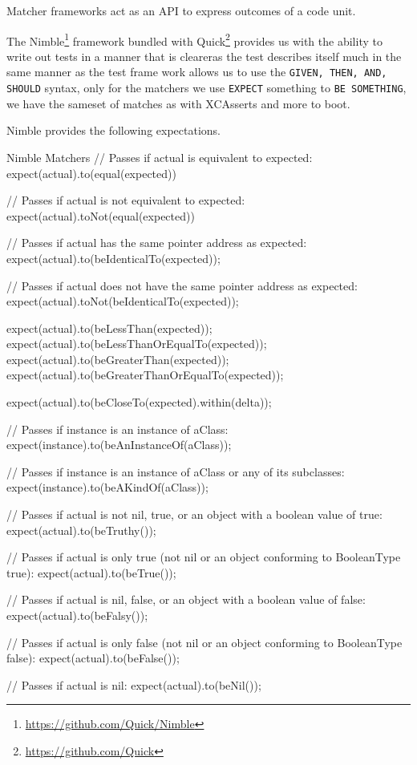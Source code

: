 \documentclass[a4paper, titlepage]{article}
\begin{document}
Matcher frameworks act as an API to express outcomes of a code unit.

The Nimble\footnote{\url{https://github.com/Quick/Nimble}}  framework
bundled with Quick\footnote{\url{https://github.com/Quick}} provides 
us with the ability to write out tests in a manner that is cleareras the
test describes itself much in the same manner as the test frame work
allows us to use the \texttt{GIVEN, THEN, AND, SHOULD} syntax, only for
the matchers we use \texttt{EXPECT} something to \texttt{BE SOMETHING},
we have the sameset of matches as with XCAsserts and more to boot.

Nimble provides the following expectations.
\begin{listbox}{1}{Nimble Matchers}
// Passes if actual is equivalent to expected:
expect(actual).to(equal(expected))

// Passes if actual is not equivalent to expected:
expect(actual).toNot(equal(expected))

// Passes if actual has the same pointer address as expected:
expect(actual).to(beIdenticalTo(expected));

// Passes if actual does not have the same pointer address as expected:
expect(actual).toNot(beIdenticalTo(expected));

expect(actual).to(beLessThan(expected));
expect(actual).to(beLessThanOrEqualTo(expected));
expect(actual).to(beGreaterThan(expected));
expect(actual).to(beGreaterThanOrEqualTo(expected));

expect(actual).to(beCloseTo(expected).within(delta));

// Passes if instance is an instance of aClass:
expect(instance).to(beAnInstanceOf(aClass));

// Passes if instance is an instance of aClass or any of its subclasses:
expect(instance).to(beAKindOf(aClass));

// Passes if actual is not nil, true, or an object with a boolean value of true:
expect(actual).to(beTruthy());

// Passes if actual is only true (not nil or an object conforming to BooleanType true):
expect(actual).to(beTrue());

// Passes if actual is nil, false, or an object with a boolean value of false:
expect(actual).to(beFalsy());

// Passes if actual is only false (not nil or an object conforming to BooleanType false):
expect(actual).to(beFalse());

// Passes if actual is nil:
expect(actual).to(beNil());


\end{listbox}
\end{document}
